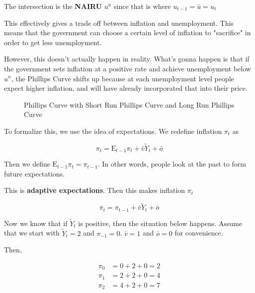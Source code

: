 \documentclass[11pt]{scrartcl}
\newcommand{\og}{\ensuremath{\tilde{Y}}}
\begin{document}
The intersection is the \textbf{NAIRU} $u^n$ since that is where $u_{t-1} = \bar{u} = u_t$

This effectively gives a trade off between inflation and unemployment. This means that the government can choose a certain level of inflation to "sacrifice" in order to get less unemployment. 

However, this doesn't actually happen in reality. What's gonna happen is that if the government sets inflation at a positive rate and achieve unemployment below $u^n$, the Phillips Curve shifts up because at each unemployment level people expect higher inflation, and will have already incorporated that into their price.

\begin{figure}[H]
\centering
{}
\caption{Phillips Curve with Short Run Phillips Curve and \color{blue} Long Run Phillips Curve}
\end{figure}

To formalize this, we use the idea of expectations. We redefine inflation $\pi_t$ as 

\[ \pi_t = \mathrm{E}_{t-1} \pi_t + \bar{v} \og_t + \bar{o} \] 

Then we define $\mathrm{E}_{t-1} \pi_t = \pi_{t-1}$. In other words, people look at the past to form future expectations. 

This is \textbf{adaptive expectations}. Then this makes inflation $\pi_t$

\[ \pi_t = \pi_{t-1} + \bar{v} \og_t + \bar{o} \] 

Now we know that if $\og_t$ is positive, then the situation below happens. Assume that we start with $\og_t = 2$ and $\pi_{-1} = 0$. $\bar{v} = 1$ and $\bar{o} = 0$ for convenience.

Then,

\begin{align*}
\pi_0 &= 0 + 2 + 0 = 2 \\ 
\pi_1 &= 2 + 2 + 0 = 4 \\ 
\pi_2 &= 4 + 2 + 0 = 7
\end{align*}
\end{document}
